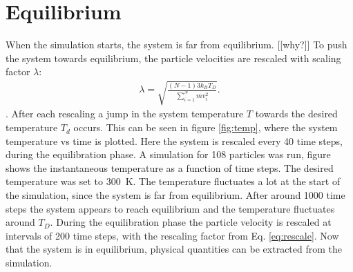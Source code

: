 \section{Equilibrium}
When the simulation starts, the system is far from equilibrium. [[why?]] To push the system towards equilibrium, the particle velocities are rescaled with scaling factor $\lambda$:
\begin{gather}\label{eq:rescale}
    \lambda=\sqrt{\frac{(N-1)3k_BT_D}{\sum_{i=1}^{N} mv_i^{2}}}.
\end{gather}. After each rescaling a jump in the system temperature $T$ towards the desired temperature $T_d$ occurs. This can be seen in figure \ref{fig:temp}, where the system temperature vs time is plotted. Here the system is rescaled every 40 time steps, during the equilibration phase.
A simulation for 108 particles was run, figure %
shows the instantaneous temperature as a function of time steps. The desired temperature was set to 300~K. The temperature fluctuates a lot at the start of the simulation, since the system is far from equilibrium. After around 1000 time steps the system appears to reach equilibrium and the temperature fluctuates around $T_D$. During the equilibration phase the particle velocity is rescaled at intervals of 200 time steps, with the rescaling factor from Eq. \ref{eq:rescale}. Now that the system is in equilibrium, physical quantities can be extracted from the simulation.